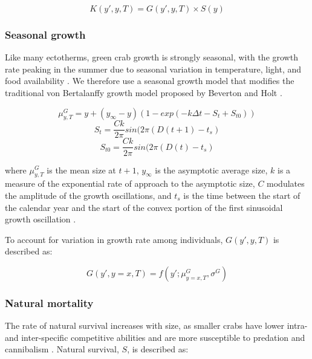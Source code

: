 \documentclass{article}
\begin{document}
\begin{equation}
K(y',y, T) = G(y',y, T) \times S(y)
\end{equation}

\subsubsection*{Seasonal growth}

Like many ectotherms, green crab growth is strongly seasonal, with the growth rate peaking in the summer due to seasonal variation in temperature, light, and food availability \parencite{contreras2003population, garcia2012technical}. We therefore use a seasonal growth model that modifies the traditional von Bertalanffy growth model proposed by Beverton and Holt \parencite{beverton2012dynamics, somers1988seasonally}.

\begin{equation}
\mu^G_{y,T} = y + (y_{\infty}-y)(1-exp(-k\Delta t-S_t+S_{t0}))
\end{equation}
\begin{equation}
S_t = \frac{Ck}{2\pi} sin(2\pi(D(t+1)-t_s)
\end{equation}
\begin{equation}
S_{t0} = \frac{Ck}{2\pi} sin(2\pi(D(t)-t_s)
\end{equation}

where $\mu^G_{y,T}$ is the mean size at $t+1$, $y_{\infty}$ is the asymptotic average size, $k$ is a measure of the exponential rate of approach to the asymptotic size, $C$ modulates the amplitude of the growth oscillations, and $t_s$ is the time between the start of the calendar year and the start of the convex portion of the first sinusoidal growth oscillation \parencite{garcia2012technical}.

To account for variation in growth rate among individuals, $G(y',y, T)$ is described as:

\begin{equation}
G(y',y=x, T) = f(y'; \mu^G_{y=x, T}, \sigma^G)
\end{equation}

\subsubsection*{Natural mortality}

The rate of natural survival increases with size, as smaller crabs have lower intra- and inter-specific competitive abilities and are more susceptible to predation and cannibalism \parencite{maszczyk2018body, grosholz2021stage}. Natural survival, $S$, is described as: 
\end{document}
